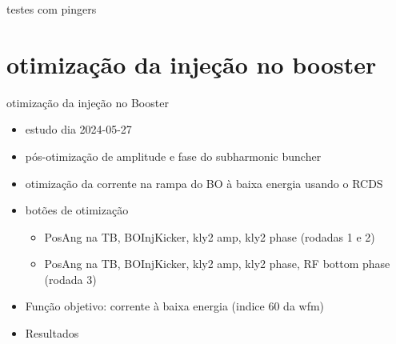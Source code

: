 \documentclass[aspectratio=169]{beamer}            %
\begin{document}
\begin{frame}{testes com pingers}
\begin{minipage}{0.49\textwidth}
\end{minipage}
\end{frame}
\section{otimização da injeção no booster}
\begin{frame}{otimização da injeção no Booster}
\begin{itemize}
    \item estudo dia 2024-05-27
    \item pós-otimização de amplitude e fase do subharmonic buncher 
    \item otimização da corrente na rampa do BO à baixa energia usando o RCDS
    \item botões de otimização
    \begin{itemize}
        \item PosAng na TB, BOInjKicker, kly2 amp, kly2 phase (rodadas 1 e 2)
        \item PosAng na TB, BOInjKicker, kly2 amp, kly2 phase, RF bottom phase (rodada 3)
    \end{itemize}
    \item Função objetivo: corrente à baixa energia (indice 60 da wfm) 
    \item Resultados
    
\end{itemize}    
\end{frame}
\end{document}
